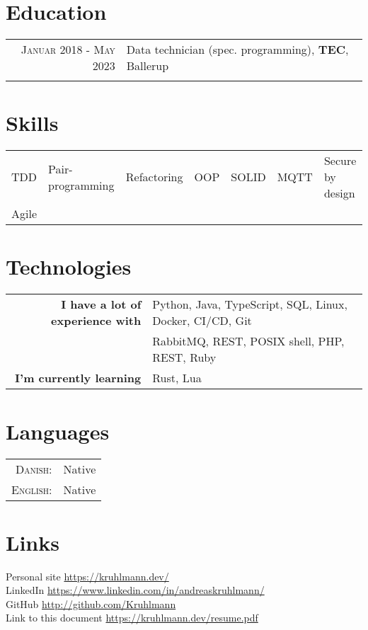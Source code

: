 \documentclass[a4paper,10pt]{article}
\begin{document}
\section{Education}
\begin{tabular}{rl}	
    \textsc{Januar 2018 - May 2023} & Data technician (spec. programming), \textbf{TEC}, Ballerup\\ & \\
\end{tabular}

\section{Skills}
\begin{tabular}{lllllll}
    TDD & Pair-programming & Refactoring & OOP & SOLID & MQTT & Secure by design\\
    Agile \\
\end{tabular}

\section{Technologies}
\begin{tabular}{rl}
    \textbf{I have a lot of experience with} & Python, Java, TypeScript, SQL, Linux, Docker, CI/CD, Git\\
    & RabbitMQ, REST, POSIX shell, PHP, REST, Ruby \\
    \textbf{I'm currently learning} & Rust, Lua
\end{tabular}

\section{Languages}
\begin{tabular}{rl}
 \textsc{Danish:}&Native\\
\textsc{English:}&Native\\
\end{tabular}

\section{Links}
Personal site \href{https://kruhlmann.dev/}{https://kruhlmann.dev/}\\
LinkedIn \href{https://www.linkedin.com/in/andreaskruhlmann/}{https://www.linkedin.com/in/andreaskruhlmann/}\\
GitHub  \href{https://github.com/Kruhlmann}{http://github.com/Kruhlmann} \\
Link to this document \href{https://kruhlmann.dev/resume.pdf}{https://kruhlmann.dev/resume.pdf}\\
\end{document}

